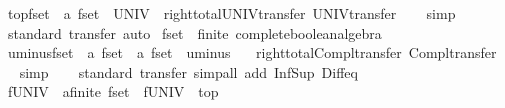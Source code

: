 \begin{isabellebody}
\isanewline
\isanewline
{}\isamarkupfalse%
\ top{\isacharunderscore}fset\ {\isacharcolon}{\isacharcolon}\ {\isachardoublequoteopen}{\isacharprime}a\ fset{\isachardoublequoteclose}\ \ UNIV\ \ right{\isacharunderscore}total{\isacharunderscore}UNIV{\isacharunderscore}transfer\ UNIV{\isacharunderscore}transfer\isanewline
%
\isadelimproof
\ \ %
\endisadelimproof
%
\isatagproof
{}\isamarkupfalse%
\ simp%
\endisatagproof
{\isafoldproof}%
%
\isadelimproof
\isanewline
%
\endisadelimproof
\isanewline
{}\isamarkupfalse%
\isanewline
%
\isadelimproof
\ \ %
\endisadelimproof
%
\isatagproof
{}\isamarkupfalse%
\ {\isacharparenleft}standard{\isacharsemicolon}\ transfer{\isacharsemicolon}\ auto{\isacharparenright}%
\endisatagproof
{\isafoldproof}%
%
\isadelimproof
\isanewline
%
\endisadelimproof
\isanewline
{}\isamarkupfalse%
\isanewline
\isanewline
{}\isamarkupfalse%
\ fset\ {\isacharcolon}{\isacharcolon}\ {\isacharparenleft}finite{\isacharparenright}\ complete{\isacharunderscore}boolean{\isacharunderscore}algebra\isanewline
{}\isanewline
\isanewline
{}\isamarkupfalse%
\ uminus{\isacharunderscore}fset\ {\isacharcolon}{\isacharcolon}\ {\isachardoublequoteopen}{\isacharprime}a\ fset\ {\isasymRightarrow}\ {\isacharprime}a\ fset{\isachardoublequoteclose}\ \ uminus\isanewline
\ \ \ right{\isacharunderscore}total{\isacharunderscore}Compl{\isacharunderscore}transfer\ Compl{\isacharunderscore}transfer%
\isadelimproof
\ %
\endisadelimproof
%
\isatagproof
{}\isamarkupfalse%
\ simp%
\endisatagproof
{\isafoldproof}%
%
\isadelimproof
%
\endisadelimproof
\isanewline
\isanewline
{}\isamarkupfalse%
\isanewline
%
\isadelimproof
\ \ %
\endisadelimproof
%
\isatagproof
{}\isamarkupfalse%
\ {\isacharparenleft}standard{\isacharsemicolon}\ transfer{\isacharparenright}\ {\isacharparenleft}simp{\isacharunderscore}all\ add{\isacharcolon}\ Inf{\isacharunderscore}Sup\ Diff{\isacharunderscore}eq{\isacharparenright}%
\endisatagproof
{\isafoldproof}%
%
\isadelimproof
\isanewline
%
\endisadelimproof
{}\isamarkupfalse%
\isanewline
\isanewline
{}\isamarkupfalse%
\ fUNIV\ {\isacharcolon}{\isacharcolon}\ {\isachardoublequoteopen}{\isacharprime}a{\isacharcolon}{\isacharcolon}finite\ fset{\isachardoublequoteclose}\ \ {\isachardoublequoteopen}fUNIV\ {\isasymequiv}\ top{\isachardoublequoteclose}\isanewline

\end{isabellebody}
